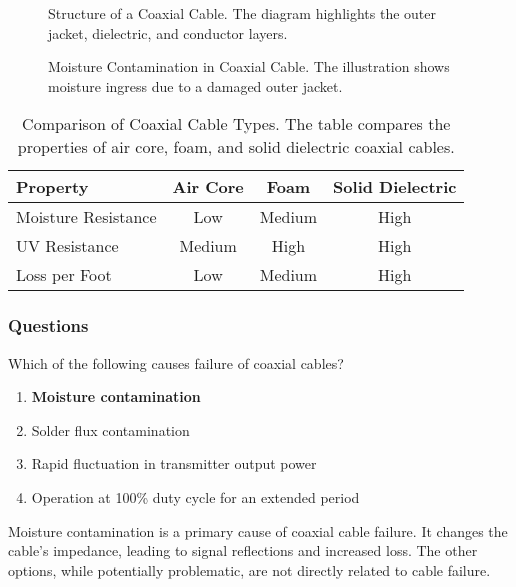 \begin{figure}[h]
    \centering
    \caption{Structure of a Coaxial Cable. The diagram highlights the outer jacket, dielectric, and conductor layers.}
    \label{fig:coax-structure}
\end{figure}

\begin{figure}[h]
    \centering
    \caption{Moisture Contamination in Coaxial Cable. The illustration shows moisture ingress due to a damaged outer jacket.}
    \label{fig:coax-moisture}
\end{figure}

\begin{table}[h]
    \centering
    \begin{tabular}{|l|c|c|c|}
        \hline
        \textbf{Property} & \textbf{Air Core} & \textbf{Foam} & \textbf{Solid Dielectric} \\
        \hline
        Moisture Resistance & Low & Medium & High \\
        UV Resistance & Medium & High & High \\
        Loss per Foot & Low & Medium & High \\
        \hline
    \end{tabular}
    \caption{Comparison of Coaxial Cable Types. The table compares the properties of air core, foam, and solid dielectric coaxial cables.}
    \label{tab:coax-comparison}
\end{table}

\subsubsection{Questions}

\begin{tcolorbox}[colback=gray!10!white,colframe=black!75!black,title={T7C09}]
    Which of the following causes failure of coaxial cables?
    \begin{enumerate}[label=\Alph*),noitemsep]
        \item \textbf{Moisture contamination}
        \item Solder flux contamination
        \item Rapid fluctuation in transmitter output power
        \item Operation at 100\% duty cycle for an extended period
    \end{enumerate}
\end{tcolorbox}
Moisture contamination is a primary cause of coaxial cable failure. It changes the cable's impedance, leading to signal reflections and increased loss. The other options, while potentially problematic, are not directly related to cable failure.

